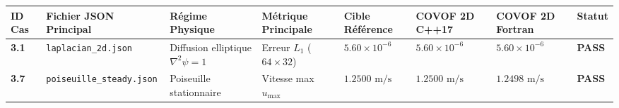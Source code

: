 \documentclass[
  10pt,
]{article}
\newcounter{none} %
\begin{document}
{\def\LTcaptype{none} %
\begin{longtable}[]{@{}
  >{\centering\arraybackslash}p{}
  >{\raggedright\arraybackslash}p{}
  >{\raggedright\arraybackslash}p{}
  >{\raggedright\arraybackslash}p{}
  >{\centering\arraybackslash}p{}
  >{\centering\arraybackslash}p{}
  >{\centering\arraybackslash}p{}
  >{\centering\arraybackslash}p{}@{}}
\toprule\noalign{}
\begin{minipage}[b]{\linewidth}\centering
ID Cas
\end{minipage} & \begin{minipage}[b]{\linewidth}\raggedright
Fichier JSON Principal
\end{minipage} & \begin{minipage}[b]{\linewidth}\raggedright
Régime Physique
\end{minipage} & \begin{minipage}[b]{\linewidth}\raggedright
Métrique Principale
\end{minipage} & \begin{minipage}[b]{\linewidth}\centering
Cible Référence
\end{minipage} & \begin{minipage}[b]{\linewidth}\centering
COVOF 2D C++17
\end{minipage} & \begin{minipage}[b]{\linewidth}\centering
COVOF 2D Fortran
\end{minipage} & \begin{minipage}[b]{\linewidth}\centering
Statut
\end{minipage} \\
\midrule\noalign{}
\endhead
\bottomrule\noalign{}
\endlastfoot
\textbf{3.1} & \texttt{laplacian\_2d.json} & Diffusion elliptique
\(\nabla^2\psi=1\) & Erreur \(L_1\) (\(64\times 32\)) &
\(5.60 \times 10^{-6}\) & \textbf{\(5.60 \times 10^{-6}\)} &
\textbf{\(5.60 \times 10^{-6}\)} & \textbf{PASS} \\
\textbf{3.7} & \texttt{poiseuille\_steady.json} & Poiseuille
stationnaire & Vitesse max \(u_{\max}\) & \(1.2500\text{ m/s}\) &
\textbf{\(1.2500\text{ m/s}\)} & \textbf{\(1.2498\text{ m/s}\)} &
\textbf{PASS} \\

\end{longtable}}
\end{document}
